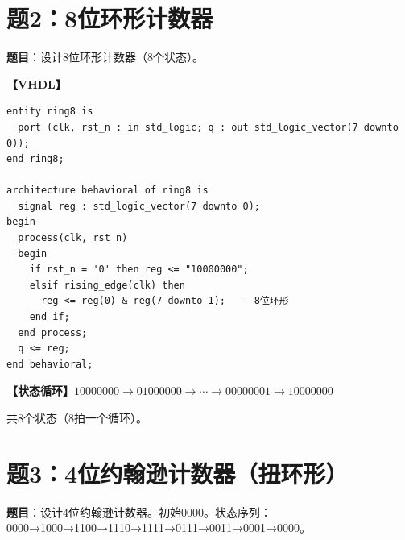 \section{题2：8位环形计数器}

\textbf{题目}：设计8位环形计数器（8个状态）。

\begin{solution}[完整解答]

\textbf{【VHDL】}
\begin{lstlisting}
entity ring8 is
  port (clk, rst_n : in std_logic; q : out std_logic_vector(7 downto 0));
end ring8;

architecture behavioral of ring8 is
  signal reg : std_logic_vector(7 downto 0);
begin
  process(clk, rst_n)
  begin
    if rst_n = '0' then reg <= "10000000";
    elsif rising_edge(clk) then
      reg <= reg(0) & reg(7 downto 1);  -- 8位环形
    end if;
  end process;
  q <= reg;
end behavioral;
\end{lstlisting}

\textbf{【状态循环】}$10000000\to01000000\to\cdots\to00000001\to10000000$

共8个状态（8拍一个循环）。

\end{solution}


\section{题3：4位约翰逊计数器（扭环形）}

\textbf{题目}：设计4位约翰逊计数器。初始0000。状态序列：0000→1000→1100→1110→1111→0111→0011→0001→0000。

